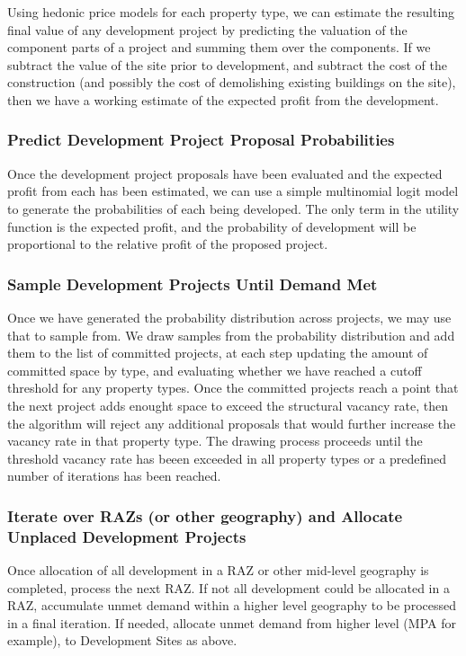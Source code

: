 Using hedonic price models for each property type, we can estimate the resulting final value of any
development project by predicting the valuation of the component parts of a project and summing them
over the components.  If we subtract the value of the site prior to development, and subtract the
cost of the construction (and possibly the cost of demolishing existing buildings on the site), then
we have a working estimate of the expected profit from the development.

\subsubsection{Predict Development Project Proposal Probabilities}
Once the development project proposals have been evaluated and the expected profit from each has been
estimated, we can use a simple multinomial logit model to generate the probabilities of each being
developed.  The only term in the utility function is the expected profit, and the probability of
development will be proportional to the relative profit of the proposed project.

\subsubsection{Sample Development Projects Until Demand Met}
Once we have generated the probability distribution across projects, we may use that to sample from.
We draw samples from the probability distribution and add them to the list of committed projects,
at each step updating the amount of committed space by type, and evaluating whether we have reached
a cutoff threshold for any property types.  Once the committed projects reach a point that the next
project adds enought space to exceed the structural vacancy rate, then the algorithm will reject any
additional proposals that would further increase the vacancy rate in that property type.  The drawing
process proceeds until the threshold vacancy rate has beeen exceeded in all property types or a
predefined number of iterations has been reached.

\subsubsection{Iterate over RAZs (or other geography) and Allocate Unplaced Development Projects}

Once allocation of all development in a RAZ or other mid-level geography is completed, process the
next RAZ. If not all development could be allocated in a RAZ, accumulate unmet demand within a higher
level geography to be processed in a final iteration. If needed, allocate unmet demand from higher
level (MPA for example), to Development Sites as above.
